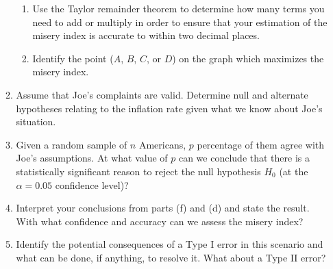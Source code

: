 \begin{enumerate}[itemsep=0.5cm]
\begin{adjustwidth}{0.3in}{0.3in}
\begin{enumerate}[itemsep=0.5cm]
\begin{enumerate}
                                    \item Use the Taylor remainder theorem to determine
                                          how many terms you need to add or multiply in order
                                          to ensure that your estimation of the misery index
                                          is accurate to within two decimal places.

                                    \item Identify the point ($A$, $B$, $C$, or
                                          $D$) on the graph which maximizes the misery
                                          index.
                              \end{enumerate}
                        \item Assume that Joe's complaints are valid. Determine null
                              and alternate hypotheses relating to the inflation rate
                              given what we know about Joe's situation.

                        \item Given a random sample of $n$ Americans, $p$ percentage
                              of them agree with Joe's assumptions. At what value of
                              $p$ can we conclude that there is a statistically
                              significant reason to reject the null hypothesis $H_0$
                              (at the $\alpha = 0.05$ confidence level)?

                        \item Interpret your conclusions from parts (f) and (d) and
                              state the result. With what confidence and accuracy can we
                              assess the misery index?

                        \item Identify the potential consequences of a Type I error
                              in this scenario and what can be done, if anything, to
                              resolve it. What about a Type II error?
                  \end{enumerate}
            \end{adjustwidth}
\end{enumerate}